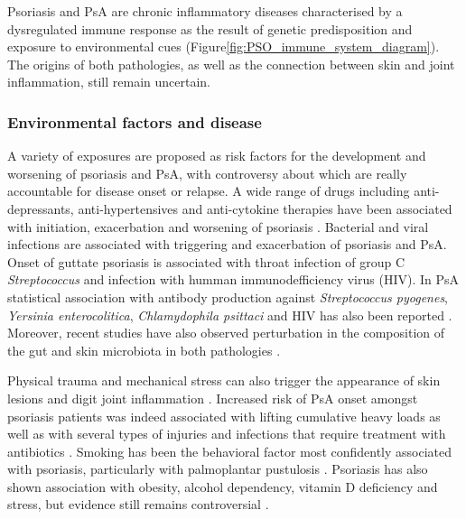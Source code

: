 Psoriasis and PsA are chronic inflammatory diseases characterised by a dysregulated immune response as the result of genetic predisposition and exposure to environmental cues (Figure\ref{fig:PSO_immune_system_diagram}). The origins of both pathologies, as well as the connection between skin and joint inflammation, still remain uncertain.


\subsubsection*{Environmental factors and disease}

A variety of exposures are proposed as risk factors for the development and worsening of psoriasis and PsA, with controversy about which are really accountable for disease onset or relapse. A wide range of drugs including anti-depressants, anti-hypertensives and anti-cytokine therapies have been associated with initiation, exacerbation and worsening of psoriasis \parencite{Kim2010}. Bacterial and viral infections are associated with triggering and exacerbation of psoriasis and PsA. Onset of guttate psoriasis is associated with throat infection of group C \textit{Streptococcus} and infection with humman immunodefficiency virus (HIV). In PsA statistical association with antibody production against \textit{Streptococcus pyogenes}, \textit{Yersinia enterocolitica}, \textit{ Chlamydophila psittaci} and HIV has also been reported \parencite{Gudjonsson2003,Valdimarsson2009,Diluvio2006,Thrastardottir2018}. Moreover, recent studies have also observed perturbation in the composition of the gut and skin microbiota in both pathologies \parencite{Eppinga2014, Yan2017}.

Physical trauma and mechanical stress can also trigger the appearance of skin lesions and digit joint inflammation \parencite {Weiss2002,Nestle2009}. Increased risk of PsA onset amongst psoriasis patients was indeed associated with lifting cumulative heavy loads as well as with several types of injuries and infections that require treatment with antibiotics \parencite{Eder2011}. Smoking has been the behavioral factor most confidently associated with psoriasis, particularly with palmoplantar pustulosis \parencite{Armstrong2014}. Psoriasis has also shown association with obesity, alcohol dependency, vitamin D deficiency and stress, but evidence still remains controversial \parencite{Meglio2014}. 

